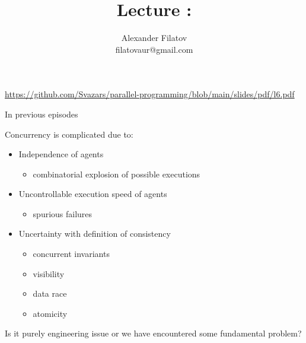 


\title[]{Lecture \foundationsNum: \foundationsTopic}
\subtitle[]{\foundationsKey}
\author[]{Alexander Filatov\\ filatovaur@gmail.com}

\date{}



\begin{frame}
  \titlepage
  \url{https://github.com/Svazars/parallel-programming/blob/main/slides/pdf/l6.pdf}
\end{frame}

\begin{frame}{In previous episodes}

Concurrency is complicated due to:
\begin{itemize}
  \item Independence of agents 
  \begin{itemize}
    \item combinatorial explosion of possible executions
  \end{itemize}
  \item Uncontrollable execution speed of agents 
  \begin{itemize}
    \item spurious failures
  \end{itemize}  
  \item Uncertainty with definition of consistency 
  \begin{itemize}
    \item concurrent invariants
    \item visibility
    \item data race
    \item atomicity
  \end{itemize}  
\end{itemize}

\pause

Is it purely engineering issue or we have encountered some fundamental problem?

\end{frame}



